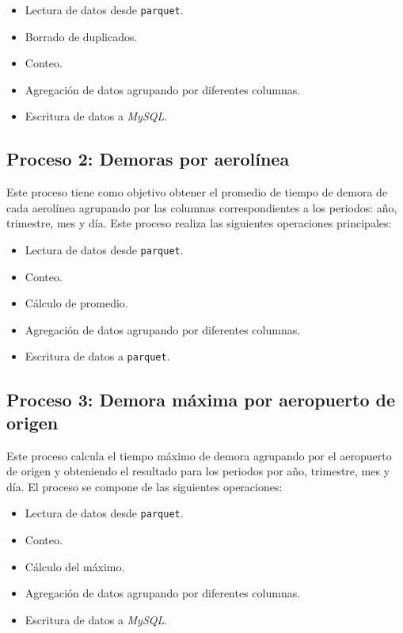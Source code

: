 \begin{itemize}
	\item Lectura de datos desde \texttt{parquet}.
	\item Borrado de duplicados.
	\item Conteo.
	\item Agregación de datos agrupando por diferentes columnas.
	\item Escritura de datos a \textit{MySQL}.
\end{itemize}

\subsection{Proceso 2: Demoras por aerolínea}

Este proceso tiene como objetivo obtener el promedio de tiempo de demora de cada aerolínea agrupando por las columnas correspondientes a los periodos: año, trimestre, mes y día. Este proceso realiza las siguientes operaciones principales:

\begin{itemize}
	\item Lectura de datos desde \texttt{parquet}.
	\item Conteo.
	\item Cálculo de promedio.
	\item Agregación de datos agrupando por diferentes columnas.
	\item Escritura de datos a \texttt{parquet}.
\end{itemize}

\subsection{Proceso 3: Demora máxima por aeropuerto de origen}

Este proceso calcula el tiempo máximo de demora agrupando por el aeropuerto de origen y obteniendo el resultado para los periodos por año, trimestre, mes y día. El proceso se compone de las siguientes operaciones:

\begin{itemize}
	\item Lectura de datos desde \texttt{parquet}.
	\item Conteo.
	\item Cálculo del máximo.
	\item Agregación de datos agrupando por diferentes columnas.
	\item Escritura de datos a \textit{MySQL}.
\end{itemize}

